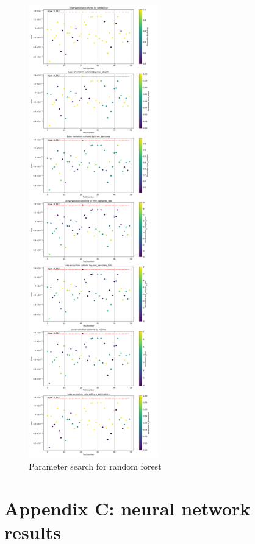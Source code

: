 \documentclass{article}
\begin{document}
    \begin{figure}[H]
        \centering
        \includegraphics[width=0.5\textwidth]{report_img/param_search/random_forest}
        \caption{Parameter search for random forest}
        \label{fig:}
    \end{figure}


    \section{Appendix C: neural network results}\label{sec:appendix-b-neural-network-results}
\end{document}
